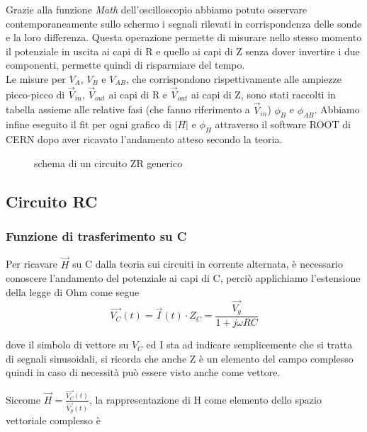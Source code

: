 \documentclass{article}
\theoremstyle{definition}
\begin{document}
\noindent Grazie alla funzione \textit{Math} dell'oscilloscopio abbiamo potuto osservare contemporaneamente sullo schermo i segnali rilevati in corrispondenza delle sonde e la loro differenza. Questa operazione permette di misurare nello stesso momento il potenziale in uscita ai capi di R e quello ai capi di Z senza dover invertire i due componenti, permette quindi di risparmiare del tempo. \\ 
Le misure per \(V_{A}\), \(V_{B}\) e \(V_{AB}\), che corrispondono rispettivamente alle ampiezze picco-picco di \(\vec{V}_{in}\), \(\vec{V}_{out}\) ai capi di R e \(\vec{V}_{out}\) ai capi di Z, sono stati raccolti in tabella assieme alle relative fasi (che fanno riferimento a \(\vec{V}_{in}\)) \(\phi_{B}\) e \(\phi_{AB}\). Abbiamo infine eseguito il fit per ogni grafico di  \(\left|H\right|\) e \(\phi_{H}\) attraverso il software ROOT di CERN dopo aver ricavato l'andamento atteso secondo la teoria.  

\begin{figure}[!ht]

	\caption{schema di un circuito ZR generico}

    \label{fig:schemaZR}

\end{figure}
\subsection{Circuito RC}
\subsubsection{Funzione di trasferimento su C}
Per ricavare \(\vec{H}\) su C dalla teoria sui circuiti in corrente alternata, è necessario conoscere l'andamento del potenziale ai capi di C, perciò applichiamo l'estensione della legge di Ohm come segue
\[\vec{V_{C}}(t) = \vec{I}(t) \cdot Z_{C} =  \frac{\vec{V_{g}}}{1 + j \omega R C }\]

\noindent dove il simbolo di vettore su \(V_{C}\) ed I sta ad indicare semplicemente che si tratta di segnali sinusoidali, si ricorda che anche Z è un elemento del campo complesso quindi in caso di necessità può essere visto anche come vettore. 

\noindent Siccome \(\vec{H}= \frac{\vec{V_{C}}(t)}{\vec{V_{g}}(t)}\), la rappresentazione di H come elemento dello spazio vettoriale complesso è
\end{document}
